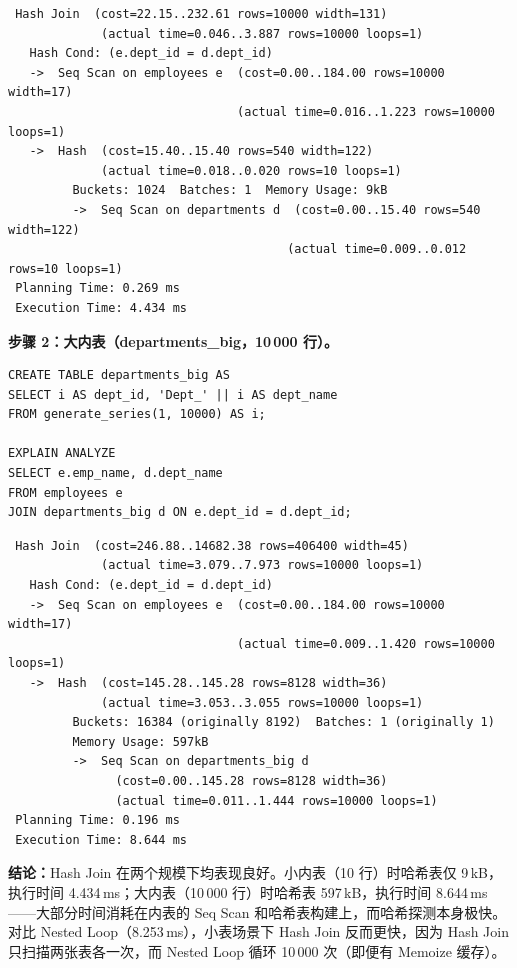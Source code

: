 \documentclass[12pt, a4paper]{academics}
\begin{document}
\begin{verbatim}
 Hash Join  (cost=22.15..232.61 rows=10000 width=131)
             (actual time=0.046..3.887 rows=10000 loops=1)
   Hash Cond: (e.dept_id = d.dept_id)
   ->  Seq Scan on employees e  (cost=0.00..184.00 rows=10000 width=17)
                                (actual time=0.016..1.223 rows=10000 loops=1)
   ->  Hash  (cost=15.40..15.40 rows=540 width=122)
             (actual time=0.018..0.020 rows=10 loops=1)
         Buckets: 1024  Batches: 1  Memory Usage: 9kB
         ->  Seq Scan on departments d  (cost=0.00..15.40 rows=540 width=122)
                                       (actual time=0.009..0.012 rows=10 loops=1)
 Planning Time: 0.269 ms
 Execution Time: 4.434 ms
\end{verbatim}

\textbf{步骤 2：大内表（departments\_big，10\,000 行）。}

\begin{verbatim}
CREATE TABLE departments_big AS
SELECT i AS dept_id, 'Dept_' || i AS dept_name
FROM generate_series(1, 10000) AS i;

EXPLAIN ANALYZE
SELECT e.emp_name, d.dept_name
FROM employees e
JOIN departments_big d ON e.dept_id = d.dept_id;
\end{verbatim}

\begin{verbatim}
 Hash Join  (cost=246.88..14682.38 rows=406400 width=45)
             (actual time=3.079..7.973 rows=10000 loops=1)
   Hash Cond: (e.dept_id = d.dept_id)
   ->  Seq Scan on employees e  (cost=0.00..184.00 rows=10000 width=17)
                                (actual time=0.009..1.420 rows=10000 loops=1)
   ->  Hash  (cost=145.28..145.28 rows=8128 width=36)
             (actual time=3.053..3.055 rows=10000 loops=1)
         Buckets: 16384 (originally 8192)  Batches: 1 (originally 1)
         Memory Usage: 597kB
         ->  Seq Scan on departments_big d
               (cost=0.00..145.28 rows=8128 width=36)
               (actual time=0.011..1.444 rows=10000 loops=1)
 Planning Time: 0.196 ms
 Execution Time: 8.644 ms
\end{verbatim}

\textbf{结论：}Hash Join 在两个规模下均表现良好。小内表（10 行）时哈希表仅 9\,kB，执行时间 4.434\,ms；大内表（10\,000 行）时哈希表 597\,kB，执行时间 8.644\,ms——大部分时间消耗在内表的 Seq Scan 和哈希表构建上，而哈希探测本身极快。对比 Nested Loop（8.253\,ms），小表场景下 Hash Join 反而更快，因为 Hash Join 只扫描两张表各一次，而 Nested Loop 循环 10\,000 次（即便有 Memoize 缓存）。
\end{document}
